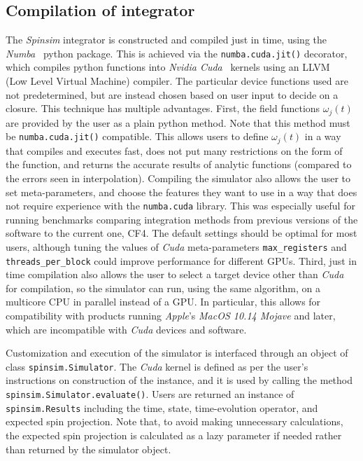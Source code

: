 \documentclass{jors}
\begin{document}
	\subsection{Compilation of integrator}
		The \emph{Spinsim} integrator is constructed and compiled just in time, using the \emph{Numba}~\cite{lam_numba_2015} python package.
		This is achieved via the \texttt{numba.cuda.jit()} decorator, which compiles python functions into \emph{Nvidia Cuda}~\cite{nickolls_scalable_2008} kernels using an LLVM~\cite{lattner_llvm_2004} (Low Level Virtual Machine) compiler.
		The particular device functions used are not predetermined, but are instead chosen based on user input to decide on a closure.
		This technique has multiple advantages.
		First, the field functions $ \omega_j(t) $ are provided by the user as a plain python method.
		Note that this method must be \texttt{numba.cuda.jit()} compatible.
		This allows users to define $ \omega_j(t) $ in a way that compiles and executes fast, does not put many restrictions on the form of the function, and returns the accurate results of analytic functions (compared to the errors seen in interpolation).
		Compiling the simulator also allows the user to set meta-parameters, and choose the features they want to use in a way that does not require experience with the \texttt{numba.cuda} library.
		This was especially useful for running benchmarks comparing integration methods from previous versions of the software to the current one, CF4.
		The default settings should be optimal for most users, although tuning the values of \emph{Cuda} meta-parameters \texttt{max\_registers} and \texttt{threads\_per\_block} could improve performance for different GPUs.
		Third, just in time compilation also allows the user to select a target device other than \emph{Cuda} for compilation, so the simulator can run, using the same algorithm, on a multicore CPU in parallel instead of a GPU.
		In particular, this allows for compatibility with products running \emph{Apple}'s \emph{MacOS 10.14 Mojave} and later, which are incompatible with \emph{Cuda} devices and software.
		
		Customization and execution of the simulator is interfaced through an object of class \texttt{spinsim.Simulator}.
		The \emph{Cuda} kernel is defined as per the user’s instructions on construction of the instance, and it is used by calling the method \texttt{spinsim.Simulator.evaluate()}.
		Users are returned an instance of \texttt{spinsim.Results} including the time, state, time-evolution operator, and expected spin projection.
		Note that, to avoid making unnecessary calculations, the expected spin projection is calculated as a lazy parameter if needed rather than returned by the simulator object.
\end{document}
